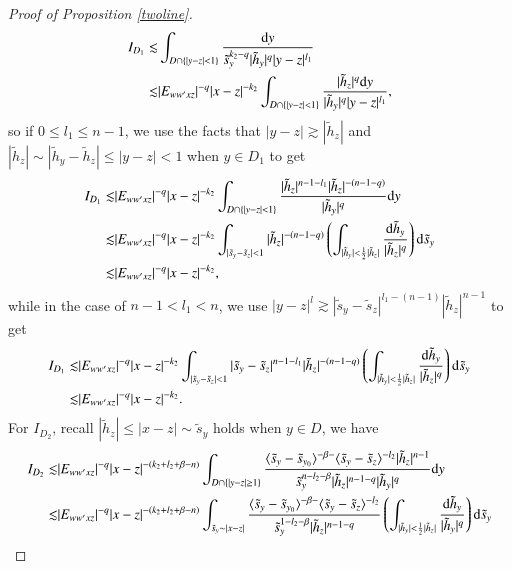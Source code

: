 \documentclass[11pt,reqno]{amsart}
\def\d{{\rm d}}
\numberwithin{equation}{section}
\theoremstyle{definition}
\begin{document}
\begin{appendix}
\begin{proof}[Proof of Proposition \ref{twoline}]
\begin{equation*}
			\begin{split}
				I_{D_1}\lesssim&\int_{D\cap\{|y-z|<1\}}\frac{\d y}{\tilde{s}_y^{k_2-q}|\tilde{h}_y|^q|y-z|^{l_1}}\\
				\lesssim&|E_{ww'xz}|^{-q}|x-z|^{-k_2}\int_{D\cap\{|y-z|<1\}}\frac{|\tilde{h}_z|^q\d y}{|\tilde{h}_y|^q|y-z|^{l_1}},
			\end{split}
		\end{equation*}
		so if $0\leq l_1\leq n-1$, we use the facts that $|y-z|\gtrsim|\tilde{h}_z|$ and $|\tilde{h}_z|\sim|\tilde{h}_y-\tilde{h}_z|\leq|y-z|<1$ when $y\in D_1$ to get
		\begin{equation*}
			\begin{split}
				I_{D_1}\lesssim&|E_{ww'xz}|^{-q}|x-z|^{-k_2}\int_{D\cap\{|y-z|<1\}}\frac{|\tilde{h}_z|^{n-1-l_1}|\tilde{h}_z|^{-(n-1-q)}}{|\tilde{h}_y|^q}\d y\\
				\lesssim&|E_{ww'xz}|^{-q}|x-z|^{-k_2}\int_{|\tilde{s}_y-\tilde{s}_z|<1}|\tilde{h}_z|^{-(n-1-q)}\left(\int_{|\tilde{h}_y|<\frac12|\tilde{h}_z|}\frac{\d\tilde{h}_y}{|\tilde{h}_z|^q}\right)\d\tilde{s}_y\\
				\lesssim&|E_{ww'xz}|^{-q}|x-z|^{-k_2},
			\end{split}
		\end{equation*}
		while in the case of $n-1<l_1<n$, we use $|y-z|^l\gtrsim|\tilde{s}_y-\tilde{s}_z|^{l_1-(n-1)}|\tilde{h}_z|^{n-1}$ to get
		\begin{equation*}
			\begin{split}
				I_{D_1}\lesssim&|E_{ww'xz}|^{-q}|x-z|^{-k_2}\int_{|\tilde{s}_y-\tilde{s}_z|<1}|\tilde{s}_y-\tilde{s}_z|^{n-1-l_1}|\tilde{h}_z|^{-(n-1-q)}\left(\int_{|\tilde{h}_y|<\frac12|\tilde{h}_z|}\frac{\d\tilde{h}_y}{|\tilde{h}_z|^q}\right)\d\tilde{s}_y\\
				\lesssim&|E_{ww'xz}|^{-q}|x-z|^{-k_2}.
			\end{split}
		\end{equation*}
		For $I_{D_2}$, recall $|\tilde{h}_z|\leq|x-z|\sim\tilde{s}_y$ holds when $y\in D$, we have
		\begin{equation}\label{ID2}
			\begin{split}
				I_{D_2}\lesssim&|E_{ww'xz}|^{-q}|x-z|^{-(k_2+l_2+\beta-n)}\int_{D\cap\{|y-z|\geq1\}}\frac{\langle\tilde{s}_y-\tilde{s}_{y_0}\rangle^{-\beta-}\langle\tilde{s}_y-\tilde{s}_z\rangle^{-l_2}|\tilde{h}_z|^{n-1}}{\tilde{s}_y^{n-l_2-\beta}|\tilde{h}_z|^{n-1-q}|\tilde{h}_y|^q}\d y\\
				\lesssim&|E_{ww'xz}|^{-q}|x-z|^{-(k_2+l_2+\beta-n)}\int_{\tilde{s}_y\sim|x-z|}\frac{\langle\tilde{s}_y-\tilde{s}_{y_0}\rangle^{-\beta-}\langle\tilde{s}_y-\tilde{s}_z\rangle^{-l_2}}{\tilde{s}_y^{1-l_2-\beta}|\tilde{h}_z|^{n-1-q}}\left(\int_{|\tilde{h}_y|<\frac12|\tilde{h}_z|}\frac{\d\tilde{h}_y}{|\tilde{h}_y|^q}\right)\d\tilde{s}_y\\

\end{split}
\end{equation}
\end{proof}
\end{appendix}
\end{document}
